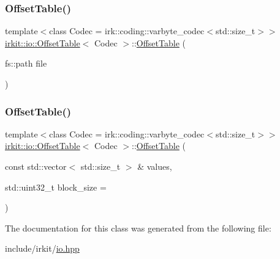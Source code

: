 \subsubsection{\texorpdfstring{Offset\+Table()}{OffsetTable()}\hspace{0.1cm}{\footnotesize\ttfamily [1/2]}}
{\footnotesize\ttfamily template$<$class Codec = irk\+::coding\+::varbyte\+\_\+codec$<$std\+::size\+\_\+t$>$$>$ \\
\mbox{\hyperlink{classirkit_1_1io_1_1OffsetTable}{irkit\+::io\+::\+Offset\+Table}}$<$ Codec $>$\+::\mbox{\hyperlink{classirkit_1_1io_1_1OffsetTable}{Offset\+Table}} (\begin{DoxyParamCaption}\item[{fs\+::path}]{file }\end{DoxyParamCaption})\hspace{0.3cm}{\ttfamily [inline]}}

\mbox{\label{classirkit_1_1io_1_1OffsetTable_a7446f4c5e47b014f914225691dffa44a}} 
\subsubsection{\texorpdfstring{Offset\+Table()}{OffsetTable()}\hspace{0.1cm}{\footnotesize\ttfamily [2/2]}}
{\footnotesize\ttfamily template$<$class Codec = irk\+::coding\+::varbyte\+\_\+codec$<$std\+::size\+\_\+t$>$$>$ \\
\mbox{\hyperlink{classirkit_1_1io_1_1OffsetTable}{irkit\+::io\+::\+Offset\+Table}}$<$ Codec $>$\+::\mbox{\hyperlink{classirkit_1_1io_1_1OffsetTable}{Offset\+Table}} (\begin{DoxyParamCaption}\item[{const std\+::vector$<$ std\+::size\+\_\+t $>$ \&}]{values,  }\item[{std\+::uint32\+\_\+t}]{block\+\_\+size = {} }\end{DoxyParamCaption})\hspace{0.3cm}{\ttfamily [inline]}}



The documentation for this class was generated from the following file\+:\begin{DoxyCompactItemize}
\item 
include/irkit/\mbox{\hyperlink{io_8hpp}{io.\+hpp}}\end{DoxyCompactItemize}
